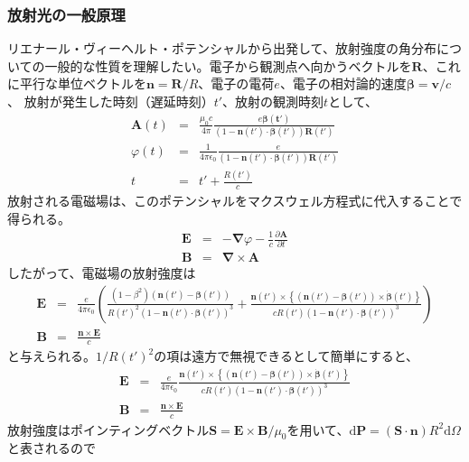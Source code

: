 \documentclass[a4paper,11pt,uplatex]{jsbook}
\begin{document}
\subsubsection{放射光の一般原理}
リエナール・ヴィーヘルト・ポテンシャルから出発して、放射強度の角分布についての一般的な性質を理解したい。電子から観測点へ向かうベクトルを$\bm{R}$、これに平行な単位ベクトルを$\bm{n} = \bm{R}/R$、電子の電荷$e$、電子の相対論的速度$\bm{\beta} = \bm{v}/c$、
放射が発生した時刻（遅延時刻）$t'$、放射の観測時刻$t$として、
\begin{eqnarray}
  \bm{A}(t) &=& \frac{\mu_0 c}{4\pi}\frac{e\bm{\beta(t')}}{(1-\bm{n}(t')\cdot\bm{\beta}(t'))\bm{R}(t')}\label{retarded potential}\\
  \varphi(t) &=& \frac{1}{4\pi \epsilon_0}\frac{e}{(1-\bm{n}(t')\cdot\bm{\beta}(t'))\bm{R}(t')}\label{retarded potential phi}\\
  t &=& t' + \frac{R(t')}{c}
\end{eqnarray}
放射される電磁場は、このポテンシャルをマクスウェル方程式に代入することで得られる。
\begin{eqnarray}
  \bm{E} &=& -\bm{\nabla} \varphi - \frac{1}{c}\frac{\partial \bm{A}}{\partial t}\\
  \bm{B} &=& \bm{\nabla} \times \bm{A}
\end{eqnarray}
したがって、電磁場の放射強度は
\begin{eqnarray}
  \bm{E} &=& \frac{e}{4\pi \epsilon_0}\left( \frac{(1-\beta^2)(\bm{n}(t')-\bm{\beta}(t'))}{R(t')^2(1-\bm{n}(t')\cdot\bm{\beta}(t'))^3}+
  \frac{\bm{n}(t')\times \left\{ (\bm{n}(t')-\bm{\beta}(t'))\times \bm{\dot{\beta}}(t')\right\}}{cR(t')(1-\bm{n}(t')\cdot\bm{\beta}(t'))^3} \right)\\
  \bm{B} &=& \frac{\bm{n}\times\bm{E}}{c}
\end{eqnarray}
と与えられる。$1/R(t')^2$の項は遠方で無視できるとして簡単にすると、
\begin{eqnarray}
  \bm{E} &=& \frac{e}{4\pi \epsilon_0}\frac{\bm{n}(t')\times \left\{ (\bm{n}(t')-\bm{\beta}(t'))\times \bm{\dot{\beta}}(t')\right\}}{cR(t')(1-\bm{n}(t')\cdot\bm{\beta}(t'))^3}\\
  \bm{B} &=& \frac{\bm{n}\times\bm{E}}{c}
\end{eqnarray}
放射強度はポインティングベクトル$\bm{S} =\bm{E}\times \bm{B}/\mu_0$を用いて、$\text{d}\bm{P} = (\bm{S}\cdot\bm{n})R^2\text{d}\Omega$と表されるので
\end{document}
